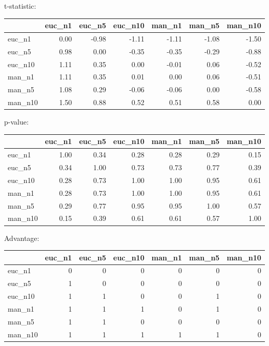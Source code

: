 t-statistic:
 \begin{tabular}{lrrrrrr}
\hline
         &   euc\_n1 &   euc\_n5 &   euc\_n10 &   man\_n1 &   man\_n5 &   man\_n10 \\
\hline
 euc\_n1  &     0.00 &    -0.98 &     -1.11 &    -1.11 &    -1.08 &     -1.50 \\
 euc\_n5  &     0.98 &     0.00 &     -0.35 &    -0.35 &    -0.29 &     -0.88 \\
 euc\_n10 &     1.11 &     0.35 &      0.00 &    -0.01 &     0.06 &     -0.52 \\
 man\_n1  &     1.11 &     0.35 &      0.01 &     0.00 &     0.06 &     -0.51 \\
 man\_n5  &     1.08 &     0.29 &     -0.06 &    -0.06 &     0.00 &     -0.58 \\
 man\_n10 &     1.50 &     0.88 &      0.52 &     0.51 &     0.58 &      0.00 \\
\hline
\end{tabular} 

p-value:
 \begin{tabular}{lrrrrrr}
\hline
         &   euc\_n1 &   euc\_n5 &   euc\_n10 &   man\_n1 &   man\_n5 &   man\_n10 \\
\hline
 euc\_n1  &     1.00 &     0.34 &      0.28 &     0.28 &     0.29 &      0.15 \\
 euc\_n5  &     0.34 &     1.00 &      0.73 &     0.73 &     0.77 &      0.39 \\
 euc\_n10 &     0.28 &     0.73 &      1.00 &     1.00 &     0.95 &      0.61 \\
 man\_n1  &     0.28 &     0.73 &      1.00 &     1.00 &     0.95 &      0.61 \\
 man\_n5  &     0.29 &     0.77 &      0.95 &     0.95 &     1.00 &      0.57 \\
 man\_n10 &     0.15 &     0.39 &      0.61 &     0.61 &     0.57 &      1.00 \\
\hline
\end{tabular} 

Advantage:
 \begin{tabular}{lrrrrrr}
\hline
         &   euc\_n1 &   euc\_n5 &   euc\_n10 &   man\_n1 &   man\_n5 &   man\_n10 \\
\hline
 euc\_n1  &        0 &        0 &         0 &        0 &        0 &         0 \\
 euc\_n5  &        1 &        0 &         0 &        0 &        0 &         0 \\
 euc\_n10 &        1 &        1 &         0 &        0 &        1 &         0 \\
 man\_n1  &        1 &        1 &         1 &        0 &        1 &         0 \\
 man\_n5  &        1 &        1 &         0 &        0 &        0 &         0 \\
 man\_n10 &        1 &        1 &         1 &        1 &        1 &         0 \\
\hline
\end{tabular} 

